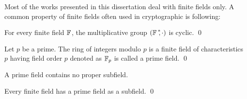 Most of the works presented in this dissertation deal with finite fields only. 
A common property of finite fields often used in cryptographic is following:
\begin{theorem}\label{Cyclic Group in Finite Field}
	For every finite field ${\mathbb{F}}_{}$, the multiplicative group $({{\mathbb{F}}_{\,}}^{\ast}\!\!, \cdot)$ is cyclic. 
	\qed
\end{theorem}

\begin{definition}
	Let $p$ be a prime. The ring of integers modulo $p$ is  a finite field of characteristics $p$ having field order $p$ denoted as ${\mathbb{F}}_{p}$ is called a prime field.
	\qed
\end{definition}
\begin{remark}
	A prime field contains no proper subfield.
\end{remark}

\begin{theorem}
	Every finite field has a prime field as a subfield. \qed
\end{theorem}

